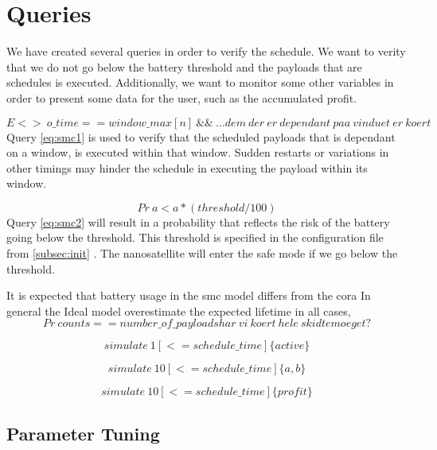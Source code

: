 \section{Queries}\label{sec:queries}
We have created several queries in order to verify the schedule. We want to verity that we do not go below the battery threshold and the payloads that are schedules is executed. Additionally, we want to monitor some other variables in order to present some data for the user, such as the accumulated profit.

\begin{equation} \label{eq:smc1}
	E<>\ o\_time == window\_max[n]\ \&\&\ ... dem\ der\ er\ dependant\ paa\ vinduet\ er\ koert
\end{equation}
Query \ref{eq:smc1} is used to verify that the scheduled payloads that is dependant on a window, is executed within that window. Sudden restarts or variations in other timings may hinder the schedule in executing the payload within its window. 

\begin{equation} \label{eq:smc2}
	Pr\ a < a*(threshold/100)
\end{equation}
Query \ref{eq:smc2} will result in a probability that reflects the risk of the battery going below the threshold. This threshold is specified in the configuration file from \cref{subsec:init} . The nanosatellite will enter the safe mode if we go below the threshold.

It is expected that battery usage in the \gls{smc} model differs from the \gls{cora} 
In general the Ideal model overestimate the expected lifetime in all cases,
\begin{equation} \label{eq:smc3}
	Pr\ counts == number\_of\_payloads har\ vi\ koert\ hele\ skidtemoeget?
\end{equation}

\begin{equation} \label{eq:smc4}
	simulate\ 1 [<=schedule\_time] \{ active\}
\end{equation}

\begin{equation} \label{eq:smc5}
	simulate\ 10 [<=schedule\_time] \{ a, b\}
\end{equation}

\begin{equation} \label{eq:smc6}
	simulate\ 10 [<= schedule\_time] \{ profit \}
\end{equation}




\subsection{Parameter Tuning}